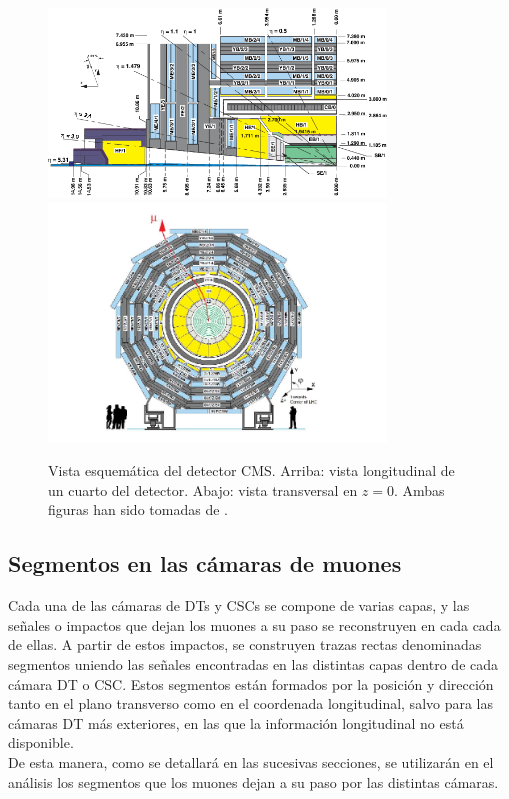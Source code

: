 \begin{figure}
\centering
\includegraphics[width=0.8\textwidth]{figures/CMSview1.png}
\includegraphics[width=0.8\textwidth]{figures/CMSview.png}
\caption{Vista esquem\'atica del detector CMS. Arriba: vista longitudinal de un cuarto del detector. Abajo: vista transversal en $z = 0$. Ambas figuras han sido tomadas de \cite{DTperformance}.}
\label{fig:CMSsub}
\end{figure}


\subsection{Segmentos en las c\'amaras de muones}

Cada una de las c\'amaras de DTs y CSCs se compone de varias capas, y las se\~nales o impactos que dejan los muones a su paso se reconstruyen en cada cada de ellas. A partir de estos impactos, se construyen trazas rectas denominadas segmentos uniendo las se\~nales encontradas en las distintas capas dentro de cada c\'amara DT o CSC. Estos segmentos est\'an formados por la posici\'on y direcci\'on tanto en el plano transverso como en el coordenada longitudinal, salvo para las c\'amaras DT m\'as exteriores, en las que la informaci\'on longitudinal no est\'a disponible. \\
De esta manera, como se detallar\'a en las sucesivas secciones, se utilizar\'an en el an\'alisis los segmentos que los muones dejan a su paso por las distintas c\'amaras.

\clearpage
